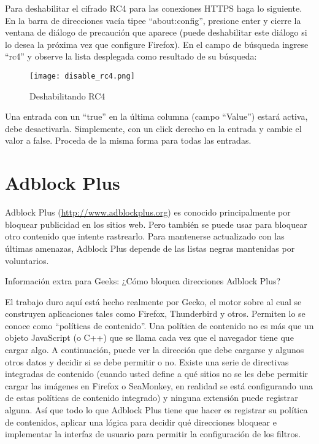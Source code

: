 \documentclass[10pt,a5paper,twoside,,]{book}
\begin{document}
Para deshabilitar el cifrado RC4 para las conexiones HTTPS haga lo
siguiente. En la barra de direcciones vacía tipee ``about:config'',
presione enter y cierre la ventana de diálogo de precaución que aparece
(puede deshabilitar este diálogo si lo desea la próxima vez que
configure Firefox). En el campo de búsqueda ingrese ``rc4'' y observe la
lista desplegada como resultado de su búsqueda:

\begin{figure}[htbp]
\centering
\texttt{[image: disable\_rc4.png]}
\caption{Deshabilitando RC4}
\end{figure}

Una entrada con un ``true'' en la última columna (campo ``Value'')
estará activa, debe desactivarla. Simplemente, con un click derecho en
la entrada y cambie el valor a false. Proceda de la misma forma para
todas las entradas.

\section{Adblock Plus}\label{adblock-plus}

Adblock Plus (\url{http://www.adblockplus.org}) es conocido
principalmente por bloquear publicidad en los sitios web. Pero también
se puede usar para bloquear otro contenido que intente rastrearlo. Para
mantenerse actualizado con las últimas amenazas, Adblock Plus depende de
las listas negras mantenidas por voluntarios.

Información extra para Geeks: ¿Cómo bloquea direcciones Adblock Plus?

El trabajo duro aquí está hecho realmente por Gecko, el motor sobre al
cual se construyen aplicaciones tales como Firefox, Thunderbird y otros.
Permiten lo se conoce como ``políticas de contenido''. Una política de
contenido no es más que un objeto JavaScript (o C++) que se llama cada
vez que el navegador tiene que cargar algo. A continuación, puede ver la
dirección que debe cargarse y algunos otros datos y decidir si se debe
permitir o no. Existe una serie de directivas integradas de contenido
(cuando usted define a qué sitios no se les debe permitir cargar las
imágenes en Firefox o SeaMonkey, en realidad se está configurando una de
estas políticas de contenido integrado) y ninguna extensión puede
registrar alguna. Así que todo lo que Adblock Plus tiene que hacer es
registrar su política de contenidos, aplicar una lógica para decidir qué
direcciones bloquear e implementar la interfaz de usuario para permitir
la configuración de los filtros.
\end{document}
